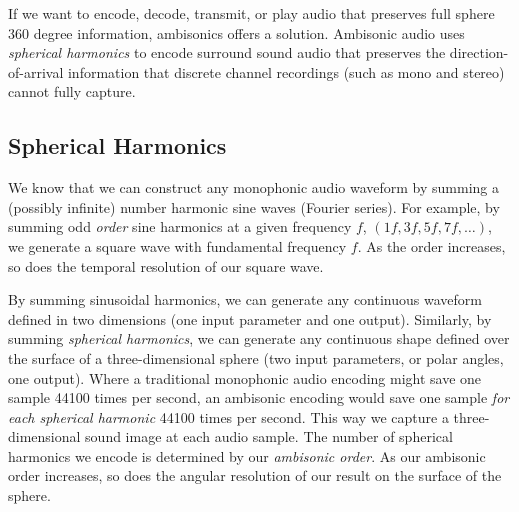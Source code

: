 If we want to encode, decode, transmit, or play audio that preserves
full sphere 360 degree information, ambisonics offers a solution.
Ambisonic audio uses \textit{spherical harmonics} to encode surround
sound audio that preserves the direction-of-arrival information that
discrete channel recordings (such as mono and stereo) cannot fully
capture.

\subsection{Spherical Harmonics}
\label{sec:spherical-harmonics}
We know that we can construct any monophonic audio waveform by summing
a (possibly infinite) number harmonic sine waves (Fourier
series).
For example, by summing odd \textit{order} sine harmonics at a given
frequency $f$, $(1f, 3f, 5f, 7f, \ldots )$, we generate a square wave
with fundamental frequency $f$. As the order increases, so does the
temporal resolution of our square wave.

By summing sinusoidal harmonics, we can generate any continuous
waveform defined in two dimensions (one input parameter and one
output). Similarly, by summing \emph{spherical harmonics}, we can
generate any continuous shape defined over the surface of a
three-dimensional sphere (two input parameters, or polar angles, one
output). Where a traditional monophonic audio encoding might save one
sample 44100 times per second, an ambisonic encoding would save one
sample \emph{for each spherical harmonic} 44100 times per second. This
way we capture a three-dimensional sound image at each audio sample.
The number of spherical harmonics we encode is determined by our
\textit{ambisonic order}. As our ambisonic order increases, so does
the angular resolution of our result on the surface of the sphere.

